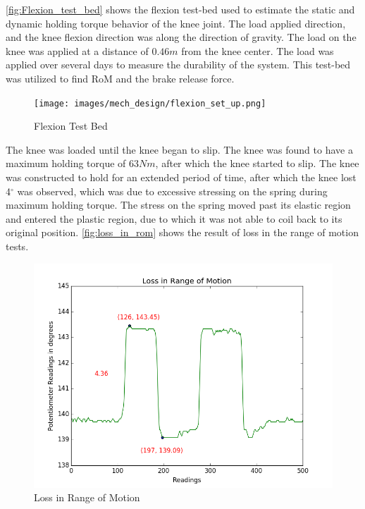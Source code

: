 \autoref{fig:Flexion_test_bed} shows the flexion test-bed used to estimate the static and dynamic holding torque behavior of the knee joint. The load applied direction, and the knee flexion direction was along the direction of gravity. The load on the knee was applied at a distance of $0.46m$ from the knee center. The load was applied over several days to measure the durability of the system. This test-bed was utilized to find RoM and the brake release force.



\begin{figure}[h]
    \centering
    \texttt{[image: images/mech\_design/flexion\_set\_up.png]}
    \caption[Flexion Test Bed]{Flexion Test Bed}
    \label{fig:Flexion_test_bed}
\end{figure}

The knee was loaded until the knee began to slip. The knee was found to have a maximum holding torque of $63Nm$, after which the knee started to slip. The knee was constructed to hold for an extended period of time, after which the knee lost 4$^{\circ}$ was observed, which was due to excessive stressing on the spring during maximum holding torque. The stress on the spring moved past its elastic region and entered the plastic region, due to which it was not able to coil back to its original position. \autoref{fig:loss_in_rom} shows the result of loss in the range of motion tests.
\begin{figure}[h!]
    \centering
    \includegraphics[scale=0.5]{ images/mech_design/loss_in_rom.png}
    \caption{Loss in Range of Motion}
    \label{fig:loss_in_rom}

\end{figure}

